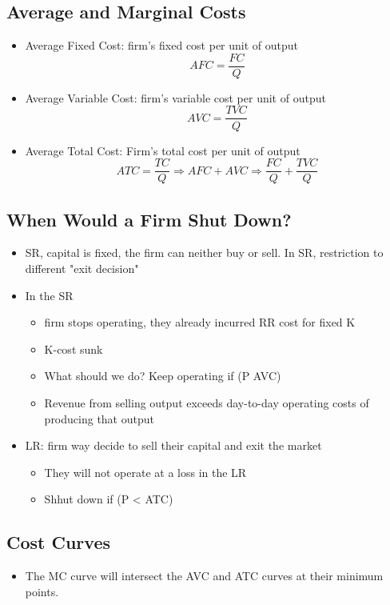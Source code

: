 \documentclass{article}
\begin{document}
\subsection{Average and Marginal Costs}
\begin{itemize}
  \item Average Fixed Cost: firm's fixed cost per unit of output
    $$ AFC = \frac{FC}{Q} $$
  \item Average Variable Cost: firm's variable cost per unit of output
    $$ AVC = \frac{TVC}{Q} $$
  \item Average Total Cost: Firm's total cost per unit of output
    $$ ATC = \frac{TC}{Q} \Rightarrow{} AFC + AVC \Rightarrow{} \frac{FC}{Q} + \frac{TVC}{Q} $$
\end{itemize}

\subsection{When Would a Firm Shut Down?}
\begin{itemize}
  \item SR, capital is fixed, the firm can
    neither buy or sell. In SR, restriction to different "exit decision"
  \item In the SR
    \begin{itemize}
      \item firm stops operating, they already incurred RR cost for fixed K
      \item K-cost sunk
      \item What should we do? Keep operating if (P \leq{} AVC)
      \item Revenue from selling output exceeds day-to-day operating costs of producing
        that output
    \end{itemize}
    \item LR: firm way decide to sell their capital and exit the market
      \begin{itemize}
        \item They will not operate at a loss in the LR
        \item Shhut down if (P < ATC)
      \end{itemize}
\end{itemize}

\subsection{Cost Curves}
\begin{itemize}
  \item The MC curve will intersect the AVC and ATC curves at their minimum points.
\end{itemize}
\end{document}
